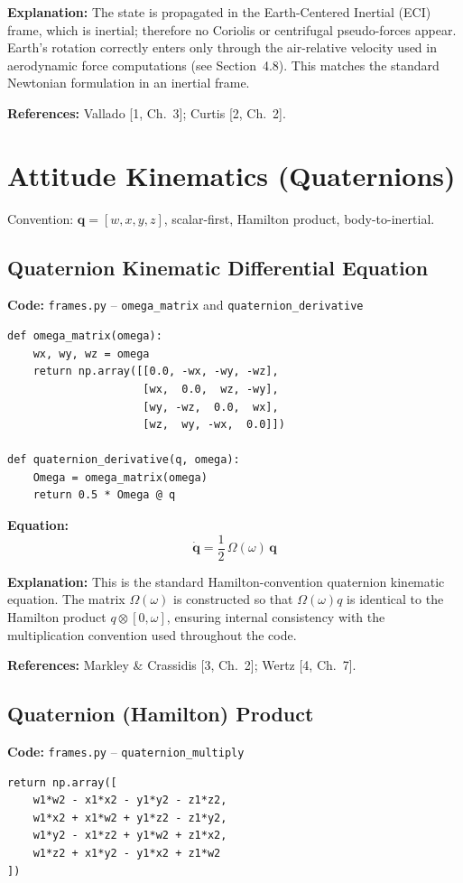 \documentclass[12pt,a4paper]{article}
\begin{document}
\textbf{Explanation:} The state is propagated in the Earth-Centered Inertial (ECI) frame, which is inertial; therefore no Coriolis or centrifugal pseudo-forces appear. Earth's rotation correctly enters only through the air-relative velocity used in aerodynamic force computations (see Section~4.8). This matches the standard Newtonian formulation in an inertial frame.

\textbf{References:} Vallado [1, Ch.~3]; Curtis [2, Ch.~2].

\section{Attitude Kinematics (Quaternions)}

Convention: $\mathbf{q} = [w,x,y,z]$, scalar-first, Hamilton product, body-to-inertial.

\subsection{Quaternion Kinematic Differential Equation}

\textbf{Code:} \texttt{frames.py} – \texttt{omega\_matrix} and \texttt{quaternion\_derivative}
\begin{verbatim}
def omega_matrix(omega):
    wx, wy, wz = omega
    return np.array([[0.0, -wx, -wy, -wz],
                     [wx,  0.0,  wz, -wy],
                     [wy, -wz,  0.0,  wx],
                     [wz,  wy, -wx,  0.0]])

def quaternion_derivative(q, omega):
    Omega = omega_matrix(omega)
    return 0.5 * Omega @ q
\end{verbatim}

\textbf{Equation:}
\[
\dot{\mathbf{q}} = \frac{1}{2}\,\Omega(\omega)\,\mathbf{q}
\]

\textbf{Explanation:} This is the standard Hamilton-convention quaternion kinematic equation. The matrix $\Omega(\omega)$ is constructed so that $\Omega(\omega)q$ is identical to the Hamilton product $q \otimes [0,\omega]$, ensuring internal consistency with the multiplication convention used throughout the code.

\textbf{References:} Markley \& Crassidis [3, Ch.~2]; Wertz [4, Ch.~7].

\subsection{Quaternion (Hamilton) Product}

\textbf{Code:} \texttt{frames.py} – \texttt{quaternion\_multiply}
\begin{verbatim}
return np.array([
    w1*w2 - x1*x2 - y1*y2 - z1*z2,
    w1*x2 + x1*w2 + y1*z2 - z1*y2,
    w1*y2 - x1*z2 + y1*w2 + z1*x2,
    w1*z2 + x1*y2 - y1*x2 + z1*w2
])
\end{verbatim}
\end{document}
